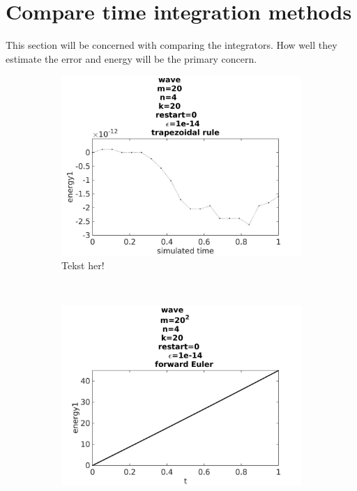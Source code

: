 \chapter{Compare time integration methods}
This section will be concerned with comparing the integrators. How well they estimate the error and energy will be the primary concern.

\begin{figure}[H]
        \centering
        \begin{subfigure}[b]{0.30\textwidth}
                \includegraphics[width=\textwidth]{../MATLAB/fig/energyovertimetrapezoidal.jpg}
                \caption{ Tekst her! }
                \label{fig:errora}
        \end{subfigure}%
        ~
        \begin{subfigure}[b]{0.30\textwidth}
                \includegraphics[width=\textwidth]{../MATLAB/fig/energyovertimeeuler.jpg}

\end{subfigure}
\end{figure}
